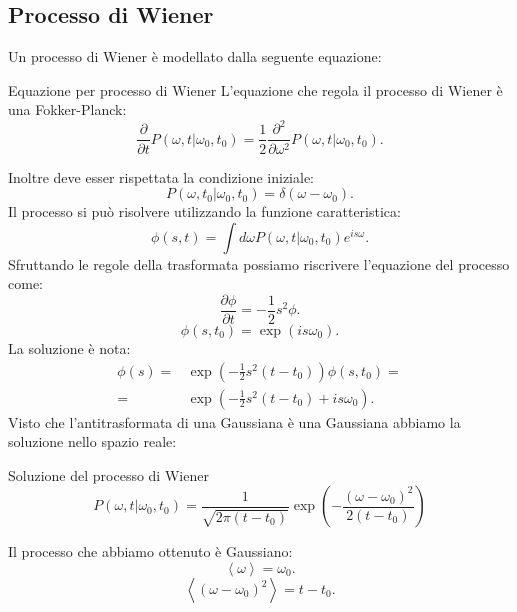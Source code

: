\noindent

\subsection{Processo di Wiener}%
\label{sub:Processo di Wiener}
Un processo di Wiener è modellato dalla seguente equazione:
\begin{greenbox}{Equazione per processo di Wiener}
    L'equazione che regola il processo di Wiener è una Fokker-Planck:
    \[
	\frac{\partial }{\partial t} P(\omega,t|\omega_0, t_0) =
	\frac{1}{2}\frac{\partial ^2}{\partial \omega^2} P(\omega, t|\omega_0, t_0) 
    .\] 
\end{greenbox}
\noindent
Inoltre deve esser rispettata la condizione iniziale:
\[
    P(\omega,t_0|\omega_0, t_0) = \delta (\omega-\omega_0) 
.\]
Il processo si può risolvere utilizzando la funzione caratteristica:
\[
    \phi (s, t) = \int d\omega P(\omega, t|\omega_0, t_0) e^{is\omega}
.\] 
Sfruttando le regole della trasformata possiamo riscrivere l'equazione del processo come:
\[
    \frac{\partial \phi }{\partial t} = -\frac{1}{2}s^2\phi
.\] 
\[
    \phi (s, t_0) = \exp (is\omega_0) 
.\] 
La soluzione è nota:
\[\begin{aligned}
    \phi (s) =& \exp\left(-\frac{1}{2}s^2\left(t-t_0\right)\right)\phi (s,t_0)  =\\
    	=&\exp\left(-\frac{1}{2}s^2\left(t-t_0\right) + is\omega_0 \right) 
.\end{aligned}\]
Visto che l'antitrasformata di una Gaussiana è una Gaussiana abbiamo la soluzione nello spazio reale:
\begin{redbox}{Soluzione del processo di Wiener}
    \[
	P(\omega,t|\omega_0, t_0) = 
	\frac{1}{\sqrt{2\pi\left(t-t_0\right)} }
	\exp\left(- \frac{\left(\omega-\omega_0\right)^2}{2\left(t-t_0\right)}\right)
    \] 
\end{redbox}
\noindent
Il processo che abbiamo ottenuto è Gaussiano:
\[
    \left<\omega\right> =  \omega_0
.\] 
\[
    \left<\left(\omega-\omega_0\right)^2\right> = t- t_0
.\] 

